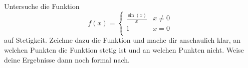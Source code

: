\begin{exercise}
  Untersuche die Funktion
  \begin{equation*}
    f(x)
    =
    \begin{cases}
      \frac{\sin(x)}{x} & x \neq 0 \\
      1                 & x = 0    \\
    \end{cases}
  \end{equation*}
  auf Stetigkeit. Zeichne dazu die Funktion und mache dir anschaulich klar, an
  welchen Punkten die Funktion stetig ist und an welchen Punkten nicht. Weise
  deine Ergebnisse dann noch formal nach.
\end{exercise}
